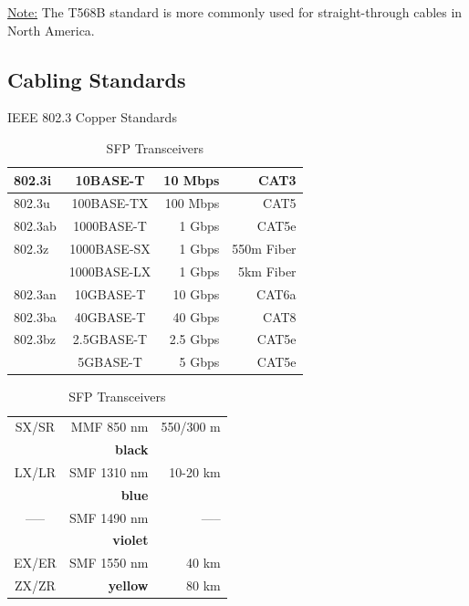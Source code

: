 \documentclass[12pt]{article}
\newif\ifcolor											%
\newcommand{\textcolorbf}[2]{\ifcolor \textcolor{#1}{\textbf{#2}}\else \textbf{#2}\fi}
\newcommand{\note}[1]{\ifcolor \colorbox{#1}{Note:}\else \underline{Note:}\fi}
\begin{document}
	\note{Goldenrod} The T568B standard is more commonly used for straight-through cables in North America.


	\subsection{Cabling Standards \label{subsec:CABLING}}
	\begin{table}[H]
	\begin{minipage}[t]{.58\linewidth}
	\centering
	\caption{IEEE 802.3 Copper Standards \label{tab:802.3 COPPER}}
	\begin{tabular}{| l | c | r r |}\hline
	802.3i		& 10BASE-T 		& 10 Mbps 		&CAT3\\\hline
	802.3u 	& 100BASE-TX 		& 100 Mbps 	&CAT5\\\hline
	802.3ab 	& 1000BASE-T 		& 1 Gbps 		&CAT5e\\\hline
	802.3z 	& 1000BASE-SX 		& 1 Gbps		&550m Fiber\\
			& 1000BASE-LX		& 1 Gbps		&5km Fiber\\\hline
	802.3an 	& 10GBASE-T 		& 10 Gbps 		&CAT6a\\\hline
	802.3ba 	& 40GBASE-T 		& 40 Gbps 		&CAT8\\\hline
	802.3bz 	& 2.5GBASE-T 		& 2.5 Gbps 		&CAT5e\\
			& 5GBASE-T 		& 5 Gbps 		&CAT5e\\\hline
	\end{tabular}\end{minipage}\hfill
	\begin{minipage}[t]{.42\linewidth}
	\centering
	\caption{SFP Transceivers \label{tab:SFP}}
	\begin{tabular}{| c | r | r |}\hline
	SX/SR		& MMF 850 nm				& 550/300 m\\
			& \textbf{black}				&\\\hline
	LX/LR		& SMF 1310 nm				& 10-20 km\\
			& \textcolorbf{Cyan}{blue}		&\\\hline
	----- 		& SMF 1490 nm				& -----\\
			& \textcolorbf{Orchid}{violet}		&\\\hline
	EX/ER		& SMF 1550 nm				& 40 km\\
	ZX/ZR	& \textcolorbf{Dandelion}{yellow}	& 80 km\\\hline
	\end{tabular}\end{minipage}\end{table}%
	
\end{document}
